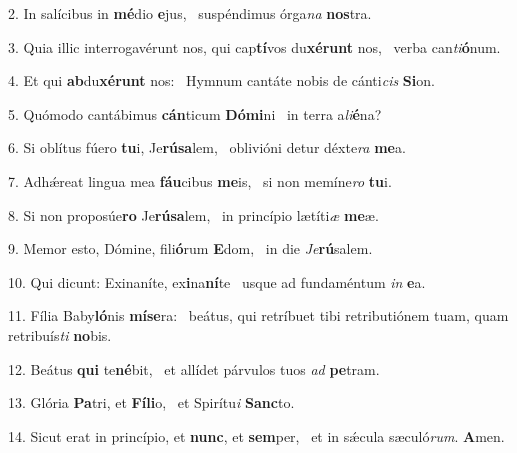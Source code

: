 2. In salícibus in \textbf{mé}dio \textbf{e}jus, \ast\  suspéndimus órga\textit{na} \textbf{nos}tra.\

3. Quia illic interrogavérunt nos, qui cap\textbf{tí}vos du\textbf{xé}\textbf{runt} nos, \ast\  verba can\textit{ti}\textbf{ó}num.\

4. Et qui \textbf{ab}du\textbf{xé}\textbf{runt} nos: \ast\  Hymnum cantáte nobis de cánti\textit{cis} \textbf{Si}on.\

5. Quómodo cantábimus \textbf{cán}ticum \textbf{Dó}\textbf{mi}ni \ast\  in terra a\textit{li}\textbf{é}na?\

6. Si oblítus fúero \textbf{tu}i, Je\textbf{rú}\textbf{sa}lem, \ast\  oblivióni detur déxte\textit{ra} \textbf{me}a.\

7. Adhǽreat lingua mea \textbf{fáu}cibus \textbf{me}is, \ast\  si non memíne\textit{ro} \textbf{tu}i.\

8. Si non proposúe\textbf{ro} Je\textbf{rú}\textbf{sa}lem, \ast\  in princípio lætíti\textit{æ} \textbf{me}æ.\

9. Memor esto, Dómine, fili\textbf{ó}rum \textbf{E}dom, \ast\  in die \textit{Je}\textbf{rú}salem.\

10. Qui dicunt: Exinaníte, ex\textbf{i}na\textbf{ní}te \ast\  usque ad fundaméntum \textit{in} \textbf{e}a.\

11. Fília Baby\textbf{ló}nis \textbf{mí}\textbf{se}ra: \ast\  beátus, qui retríbuet tibi retributiónem tuam, quam retribuís\textit{ti} \textbf{no}bis.\

12. Beátus \textbf{qui} te\textbf{né}bit, \ast\  et allídet párvulos tuos \textit{ad} \textbf{pe}tram.\

13. Glória \textbf{Pa}tri, et \textbf{Fí}\textbf{li}o, \ast\  et Spirítu\textit{i} \textbf{Sanc}to.\

14. Sicut erat in princípio, et \textbf{nunc}, et \textbf{sem}per, \ast\  et in sǽcula sæculó\textit{rum}. \textbf{A}men.\


